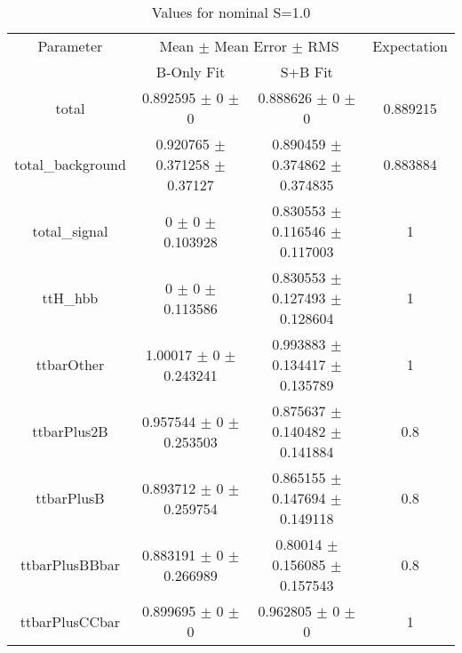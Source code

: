 \begin{table}
\centering
\caption{Values for nominal S=1.0}
\begin{tabular}{cccc}
\toprule
Parameter & \multicolumn{2}{c}{Mean $\pm$ Mean Error $\pm$ RMS} & Expectation\\
 & B-Only Fit & S+B Fit & \\
\midrule
total & \num{0.892595} $\pm$ \num{0} $\pm$ \num{0} & \num{0.888626} $\pm$ \num{0} $\pm$ \num{0} & \num{0.889215}\\
total\_background & \num{0.920765} $\pm$ \num{0.371258} $\pm$ \num{0.37127} & \num{0.890459} $\pm$ \num{0.374862} $\pm$ \num{0.374835} & \num{0.883884}\\
total\_signal & \num{0} $\pm$ \num{0} $\pm$ \num{0.103928} & \num{0.830553} $\pm$ \num{0.116546} $\pm$ \num{0.117003} & \num{1}\\
ttH\_hbb & \num{0} $\pm$ \num{0} $\pm$ \num{0.113586} & \num{0.830553} $\pm$ \num{0.127493} $\pm$ \num{0.128604} & \num{1}\\
ttbarOther & \num{1.00017} $\pm$ \num{0} $\pm$ \num{0.243241} & \num{0.993883} $\pm$ \num{0.134417} $\pm$ \num{0.135789} & \num{1}\\
ttbarPlus2B & \num{0.957544} $\pm$ \num{0} $\pm$ \num{0.253503} & \num{0.875637} $\pm$ \num{0.140482} $\pm$ \num{0.141884} & \num{0.8}\\
ttbarPlusB & \num{0.893712} $\pm$ \num{0} $\pm$ \num{0.259754} & \num{0.865155} $\pm$ \num{0.147694} $\pm$ \num{0.149118} & \num{0.8}\\
ttbarPlusBBbar & \num{0.883191} $\pm$ \num{0} $\pm$ \num{0.266989} & \num{0.80014} $\pm$ \num{0.156085} $\pm$ \num{0.157543} & \num{0.8}\\
ttbarPlusCCbar & \num{0.899695} $\pm$ \num{0} $\pm$ \num{0} & \num{0.962805} $\pm$ \num{0} $\pm$ \num{0} & \num{1}\\
\bottomrule
\end{tabular}
\end{table}